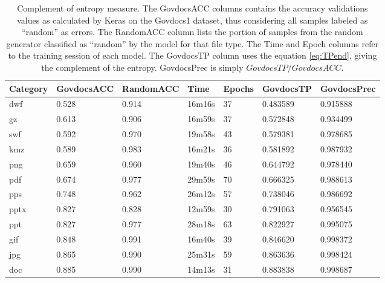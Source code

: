 \begin{table}[!ht]
    \centering
    \caption[Complement of entropy measure]{Complement of entropy measure. The GovdocsACC columns contains the accuracy validations values as calculated by Keras on the Govdocs1 dataset, thus considering all samples labeled as ``random'' as errors. The RandomACC column lists the portion of samples from the random generator classified as ``random'' by the model for that file type. The Time and Epoch columns refer to the training session of each model. The GovdocsTP column uses the equation \ref{eq:TPend}, giving the complement of the entropy. GovdocsPrec is simply $GovdocsTP/GovdocsACC$.}
    \label{tab:pass1}
\begin{tabular}{|l|l|l|l|l|l|l|}
\hline
Category & GovdocsACC & RandomACC & Time   & Epochs & GovdocsTP & GovdocsPrec \\ \hline
dwf      & 0.528           & 0.914          & 16m16s & 37     & 0.483589  & 0.915888         \\ \hline
gz       & 0.613           & 0.906          & 16m59s & 37     & 0.572848  & 0.934499         \\ \hline
swf      & 0.592           & 0.970          & 19m58s & 43     & 0.579381  & 0.978685         \\ \hline
kmz      & 0.589           & 0.983          & 16m21s & 36     & 0.581892  & 0.987932         \\ \hline
png      & 0.659           & 0.960          & 19m40s & 46     & 0.644792  & 0.978440         \\ \hline
pdf      & 0.674           & 0.977          & 29m59s & 70     & 0.666325  & 0.988613         \\ \hline
pps      & 0.748           & 0.962          & 26m12s & 57     & 0.738046  & 0.986692         \\ \hline
pptx     & 0.827           & 0.828          & 12m59s & 30     & 0.791063  & 0.956545         \\ \hline
ppt      & 0.827           & 0.977          & 28m18s & 63     & 0.822927  & 0.995075         \\ \hline
gif      & 0.848           & 0.991          & 16m40s & 39     & 0.846620  & 0.998372         \\ \hline
jpg      & 0.865           & 0.990          & 25m31s & 59     & 0.863636  & 0.998424         \\ \hline
doc      & 0.885           & 0.990          & 14m13s & 31     & 0.883838  & 0.998687         \\ \hline

\end{tabular}
\end{table}
